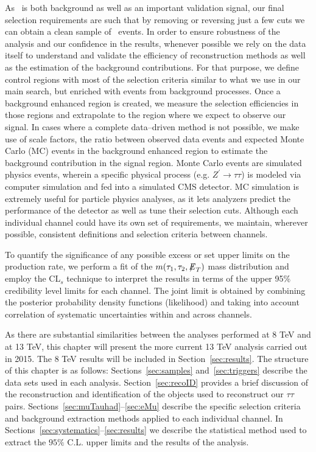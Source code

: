 As \zditau ~is both background as well as an important validation signal, our final selection requirements are such that by removing or
reversing just a few cuts we can obtain a clean sample of \zditau ~events. In order to ensure robustness of the analysis and our
confidence in the results, whenever possible we rely on the data itself to understand and validate the efficiency of reconstruction
methods as well as the estimation of the background contributions. For that purpose, we define control regions with most of the
selection criteria similar to what we use in our main search, but enriched with events from background processes. Once a background enhanced
region is created, we measure the selection efficiencies in those regions and  extrapolate to the region  where we expect to observe our
signal. In cases where a complete data--driven method is not possible, we make use of scale factors, the ratio between observed data events
and expected Monte Carlo (MC) events in the background enhanced region to estimate the background  contribution in the signal region. Monte Carlo events are simulated physics events, wherein a specific physical process (e.g. $Z^\prime \to \tau\tau$) is modeled via computer simulation and fed into a simulated CMS detector. MC simulation is extremely useful for particle physics analyses, as it lets analyzers predict the performance of the detector as well as tune their selection cuts. Although each
individual channel could have its own set of requirements, we maintain, wherever possible, consistent definitions and selection
criteria between channels.

To quantify the significance of any possible excess or set upper limits on the production rate, we perform a fit of the $m(\tau_{1},\tau_{2},{\not\mathrel{E}}_T)$ mass 
distribution and employ the CL$_{s}$ technique to interpret the results in terms of the upper 95\% credibility level limits
for each channel. The joint limit is obtained by combining the posterior probability density functions (likelihood) and taking into
account correlation of systematic uncertainties within and across channels.

As there are substantial similarities between the analyses performed at 8 TeV and at 13 TeV, this chapter will present the more current 13 TeV analysis carried out in 2015. The 8 TeV results will be included in Section~\ref{sec:results}. The structure of this chapter is as follows: Sections~\ref{sec:samples} and~\ref{sec:triggers} describe the data sets used in each analysis.  Section~\ref{sec:recoID} provides a brief discussion of the reconstruction and identification of the objects used to reconstruct our  $\tau\tau$ 
pairs.
Sections~\ref{sec:muTauhad}--\ref{sec:eMu} describe the specific selection criteria and background extraction methods applied  to each
individual channel. In Sections~\ref{sec:systematics}--\ref{sec:results} we describe the statistical method used to extract 
the $95\%$ C.L. upper limits and the results of the analysis. 
  
